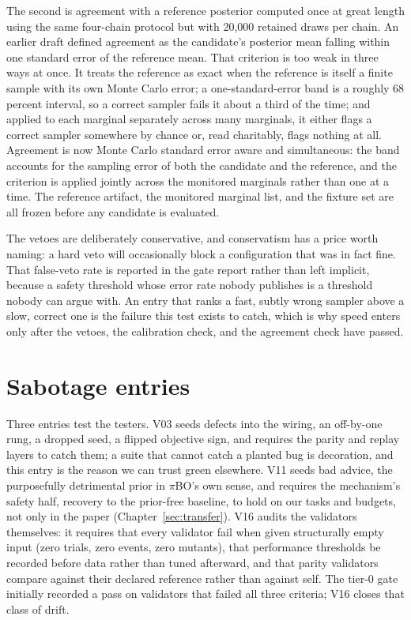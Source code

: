 The second is agreement with a reference posterior computed once at
great length using the same four-chain protocol but with 20,000
retained draws per chain. An earlier draft defined agreement as the
candidate's posterior mean falling within one standard error of the
reference mean. That criterion is too weak in three ways at once. It
treats the reference as exact when the reference is itself a finite
sample with its own Monte Carlo error; a one-standard-error band is a
roughly 68 percent interval, so a correct sampler fails it about a third
of the time; and applied to each marginal separately across many
marginals, it either flags a correct sampler somewhere by chance or, read
charitably, flags nothing at all. Agreement is now Monte Carlo standard
error aware and simultaneous: the band accounts for the sampling error of
both the candidate and the reference, and the criterion is applied
jointly across the monitored marginals rather than one at a time. The
reference artifact, the monitored marginal list, and the fixture set are
all frozen before any candidate is evaluated.

The vetoes are deliberately conservative, and conservatism has a price
worth naming: a hard veto will occasionally block a configuration that
was in fact fine. That false-veto rate is reported in the gate report
rather than left implicit, because a safety threshold whose error rate
nobody publishes is a threshold nobody can argue with. An entry that
ranks a fast, subtly wrong sampler above a slow, correct one is the
failure this test exists to catch, which is why speed enters only after
the vetoes, the calibration check, and the agreement check have passed.

\section{Sabotage entries}
\label{sec:sabotage}

Three entries test the testers. V03 seeds defects into the wiring, an
off-by-one rung, a dropped seed, a flipped objective sign, and
requires the parity and replay layers to catch them; a suite that
cannot catch a planted bug is decoration, and this entry is the
reason we can trust green elsewhere. V11 seeds bad advice, the
purposefully detrimental prior in $\pi$BO's own sense, and requires
the mechanism's safety half, recovery to the prior-free baseline, to
hold on our tasks and budgets, not only in the paper
(Chapter~\ref{sec:transfer}). V16 audits the validators themselves:
it requires that every validator fail when given structurally empty
input (zero trials, zero events, zero mutants), that performance
thresholds be recorded before data rather than tuned afterward, and
that parity validators compare against their declared reference rather
than against self. The tier-0 gate initially recorded a pass on
validators that failed all three criteria; V16 closes that class of
drift.

